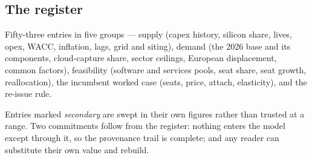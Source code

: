 \documentclass[11pt,letterpaper]{article}
\begin{document}
\subsection*{The register}
Fifty-three entries in five groups --- supply (capex history, silicon share, lives, opex, WACC, inflation, lags, grid and siting), demand (the 2026 base and its components, cloud-capture share, sector ceilings, European displacement, common factors), feasibility (software and services pools, seat share, seat growth, reallocation), the incumbent worked case (seats, price, attach, elasticity), and the re-issue rule.

Entries marked \emph{secondary} are swept in their own figures rather than trusted at a range. Two commitments follow from the register: nothing enters the model except through it, so the provenance trail is complete; and any reader can substitute their own value and rebuild.
\end{document}
